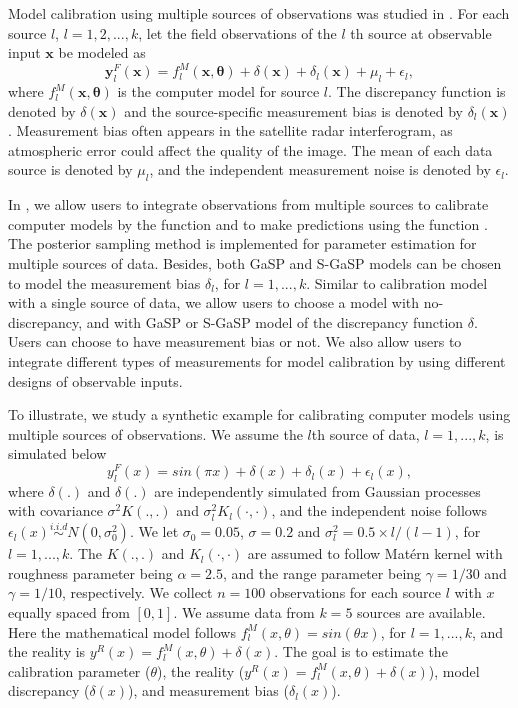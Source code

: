 Model calibration using multiple sources of observations was {studied} in \cite{gu2022calibration}. For each source $l$, $l=1,2,...,k$, let the field observations of the $l$ th source at observable input $\mathbf x$ be modeled as
\begin{equation}
\mathbf y^F_l(\mathbf x)=  f^M_l(\mathbf x, \bm \theta)+ \delta(\mathbf x)+ \delta_l(\mathbf x)  +\mu_l+\epsilon_{l},
\label{equ:measurement_bias}
\end{equation}
where  $f^M_l(\mathbf x, \bm \theta)$ is the computer model for source $l$. The discrepancy function is denoted by $\delta(\mathbf x)$ and the source-specific measurement bias is denoted by $\delta_l(\mathbf x)$.
 Measurement bias often appears in the satellite radar interferogram, as atmospheric error could affect the quality of the image.  The  mean  of each data source is denoted by $\mu_l$, and the independent measurement noise is denoted by $\epsilon_{l}$. 

In , we allow users to integrate observations from multiple sources to calibrate computer models by the function  and to make predictions using the function . The posterior sampling method is implemented for parameter estimation for multiple sources of data. Besides, both GaSP  and S-GaSP models can be chosen to model the measurement bias $\delta_l$, for $l=1,...,k$. Similar to calibration model with a single source of data, we allow users to choose a model with no-discrepancy, and with GaSP or S-GaSP model of the discrepancy function $\delta$. Users can choose to have measurement bias or not.  
We also allow users to integrate different types of measurements for model calibration by using different designs of observable inputs. 

 
   To illustrate, we study a synthetic example for calibrating computer models using multiple sources of observations. We assume  the $l$th source of data, $l=1,...,k$, is simulated  below
  \begin{equation}
  y^F_l(x)=sin(\pi x)+ \delta(x)+\delta_l(x)+\epsilon_l(x),
  \label{equ:multi_calibration_measurement_bias}
  \end{equation} 
  where $\delta(.) $ and $\delta(.)$ are independently simulated from Gaussian processes with covariance $\sigma^2K(.,.)$ and $\sigma^2_lK_l(\cdot,\cdot)$, and the independent noise follows $\epsilon_l(x) \overset{i.i.d}{\sim} N(0,\sigma^2_0)$.  We let $\sigma_0=0.05$, $\sigma=0.2$ and $\sigma^2_l=0.5\times l/(l-1)$, for $l=1,...,k$. The  $K(.,.)$ and $K_l(\cdot,\cdot)$ are assumed to follow Mat{\'e}rn kernel with roughness parameter being $\alpha=2.5$, and the range parameter being $\gamma=1/30$ and $\gamma=1/10$, respectively.  We collect $n=100$ observations for each source $l$ with $x$ equally spaced from $[0,1]$. We assume data from $k=5$ sources are available. 
Here the mathematical model follows $f^M_l(x,\theta)=sin(\theta x)$, for $l=1,...,k$, and the reality  is $y^R(x)=f^M_l(x,\theta)+\delta(x)$. The goal is to estimate the calibration parameter ($\theta$), the reality ($y^R(x)=f^M_l(x,\theta)+\delta(x)$), model discrepancy ($\delta(x)$), and measurement bias ($\delta_l(x)$). 


